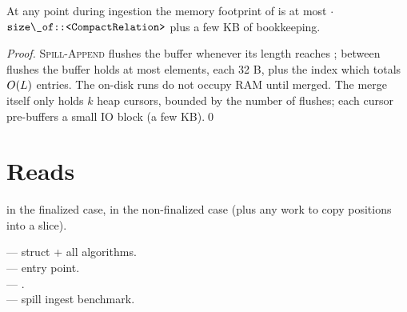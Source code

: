 \begin{theorem}
At any point during ingestion the memory footprint of
 is at most  $\cdot$
$\code{size\_of::<CompactRelation>}$ plus a few KB of bookkeeping.
\end{theorem}

\begin{proof}
\textsc{Spill-Append} flushes the buffer whenever its length reaches
; between flushes the buffer holds at most
 elements, each 32 B, plus the index
 which totals $O(L)$ entries. The
on-disk runs do not occupy RAM until merged. The merge itself only
holds $k$ heap cursors, bounded by the number of flushes; each
cursor pre-buffers a small IO block (a few KB).\qed
\end{proof}

\section{Reads}

\begin{algorithm}
\caption{\textsc{Get-Edges}}\label{alg:spill-get-edges}
\end{algorithm}

\begin{complexity}
 in the finalized case,  in the
non-finalized case (plus any work to copy positions into a slice).
\end{complexity}

\begin{inthecode}
 --- struct + all
algorithms.\\
 --- 
entry point.\\
 --- .\\
 ---
spill ingest benchmark.
\end{inthecode}
